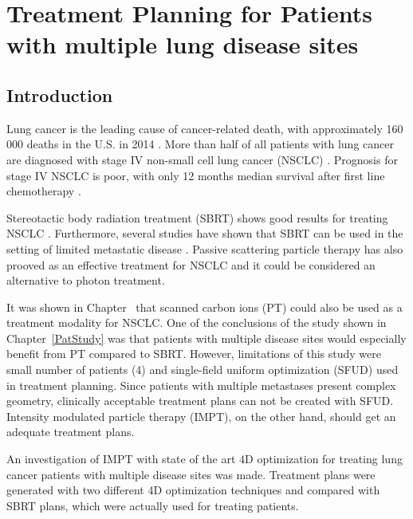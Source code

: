 \documentclass[type=dr, dr=rernat, accentcolor=tud7b,colorbacktitle, bigchapter, openright, twoside, 12pt ]{tudthesis}
\begin{document}
\chapter{Treatment Planning for Patients with multiple lung disease sites}
\label{chapter:vmm}
\minitoc

\section{Introduction}

Lung cancer is the leading cause of cancer-related death, with approximately 160 000 deaths in the U.S. in 2014 \cite{Siegel2014}.
More than half of all patients with lung cancer are diagnosed with stage IV non-small cell lung cancer (NSCLC) \cite{Ramalingam2008, Iyengar2014}.
Prognosis for stage IV NSCLC is poor, with only 12 months median survival after first line chemotherapy \cite{Socinski2013}. 

Stereotactic body radiation treatment (SBRT) shows good results for treating NSCLC \cite{Baumann2009, Fakiris2009, Grutters2010, Greco2011}. 
Furthermore, several studies have shown that SBRT can be used in the setting of limited metastatic 
disease \cite{Rusthoven2009, Villaruz2012, Salama2012, Iyengar2014}. 
Passive scattering particle therapy has also prooved as an effective treatment for NSCLC \cite{Grutters2010, Tsujii2012} and it could be considered an alternative
to photon treatment.

It was shown in Chapter~\cite{PatStudy} that scanned carbon ions (PT) could also be used as a treatment modality for NSCLC. One of the conclusions of the study shown in Chapter~\ref{PatStudy} 
was that patients with multiple disease sites would especially benefit from PT compared to SBRT. However, limitations of this study were small number of patients (4) and single-field uniform optimization (SFUD) used in treatment planning. 
Since patients with multiple metastases present complex geometry, clinically acceptable treatment plans can not be created with SFUD. Intensity modulated particle therapy (IMPT), on the other hand,
should get an adequate treatment plans.

An investigation of IMPT with state of the art 4D optimization for treating lung cancer patients with multiple disease sites was made. 
Treatment plans were generated with two different 4D optimization techniques and compared with SBRT plans, which were actually used for treating patients.


\newpage
\end{document}
